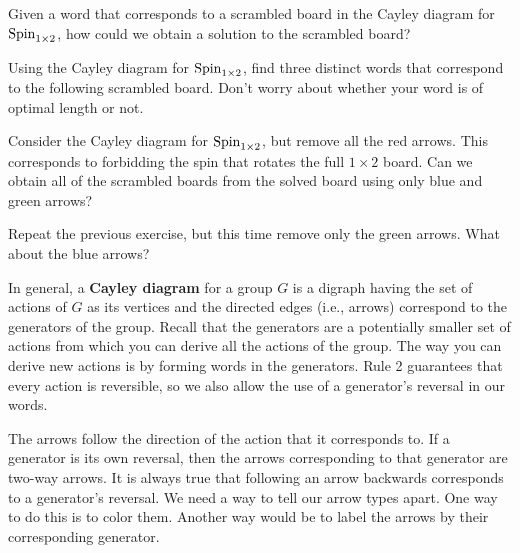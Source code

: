 \begin{exercise}
Given a word that corresponds to a scrambled board in the Cayley diagram for \(\operatorname{Spin}_{1\times 2}\), how could we obtain a solution to the scrambled board?
\end{exercise}

\begin{exercise}
Using the Cayley diagram for \(\operatorname{Spin}_{1\times 2}\), find three distinct words that correspond to the following scrambled board.  Don't worry about whether your word is of optimal length or not.

\begin{center}
\end{center}
\end{exercise}

\begin{exercise}
Consider the Cayley diagram for \(\operatorname{Spin}_{1\times 2}\), but remove all the red arrows.  This corresponds to forbidding the spin that rotates the full \(1\times 2\) board.  Can we obtain all of the scrambled boards from the solved board using only blue and green arrows?
\end{exercise}

\begin{exercise}\label{exer:minimal_Cayley_Spin1by2}
Repeat the previous exercise, but this time remove only the green arrows.  What about the blue arrows?
\end{exercise}

In general, a \textbf{Cayley diagram} for a group \(G\) is a digraph having the set of actions of \(G\) as its vertices and the directed edges (i.e., arrows) correspond to the generators of the group.  Recall that the generators are a potentially smaller set of actions from which you can derive all the actions of the group.  The way you can derive new actions is by forming words in the generators.  Rule 2 guarantees that every action is reversible, so we also allow the use of a generator's reversal in our words.  

The arrows follow the direction of the action that it corresponds to. If a generator is its own reversal, then the arrows corresponding to that generator are two-way arrows.  It is always true that following an arrow backwards corresponds to a generator's reversal.  We need a way to tell our arrow types apart.  One way to do this is to color them.  Another way would be to label the arrows by their corresponding generator.

